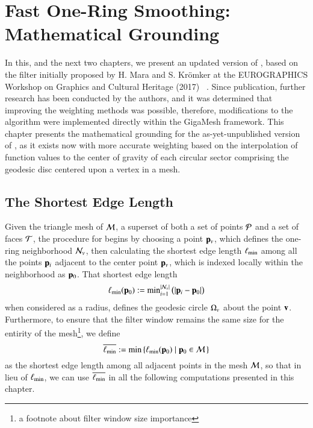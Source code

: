 \chapter{Fast One-Ring Smoothing: Mathematical Grounding}
\label{ch4}
In this, and the next two chapters, we present an updated version of , based on the filter initially proposed by H. Mara and S. Krömker at the EUROGRAPHICS Workshop on Graphics and Cultural Heritage (2017) ~\cite[s.~3.2]{Mara17}. Since publication, further research has been conducted by the authors, and it was determined that improving the weighting methods was possible, therefore, modifications to the algorithm were implemented directly within the GigaMesh  framework. This chapter presents the mathematical grounding for the as-yet-unpublished version of , as it exists now with more accurate weighting based on the interpolation of function values to the center of gravity of each circular sector comprising the geodesic disc centered upon a vertex in a mesh.

%
%
%
%
\section{The Shortest Edge Length}
\label{ch4sSEL}
Given the triangle mesh of \tdd{} $\mathcal{M}$, a superset of both a set of points $\mathcal{P}$ and a set of faces $\mathcal{T}$, the procedure for   begins by choosing a point $\mathbf{p}_v$, which defines the one-ring neighborhood $\mathcal{N}_v$, then calculating the shortest edge length $\ell_\text{min}$ among all the points $\mathbf{p}_i$ adjacent to the center point $\mathbf{p}_v$, which  is indexed locally within the neighborhood as $\mathbf{p}_0$. That shortest edge length
%
\begin{equation}
	\ell_\text{min}(\mathbf{p}_0) := \text{min}^{|\mathcal{N}_v|}_{i=1}\,\big(|\mathbf{p}_i - \mathbf{p}_0|\big)
	\label{eq:localMinimumEdgeLength}
\end{equation}%
%
%
%
when considered as a radius, defines the geodesic circle $\Omega_v$ about the point $\mathbf{v}$. Furthermore, to ensure that the filter window remains the same size for the entirity of the mesh\footnote{a footnote about filter window size importance}, we define
%
\begin{equation}
	\overline{\ell_\text{min}} := \min\left \{\ell_\text{min}(\mathbf{p}_0) \;|\; \mathbf{p}_0 \in \mathcal{M}\,\right \}
	\label{eq:globalMinimumEdgeLength}
\end{equation}%
%
%
as the shortest edge length among all adjacent points in the mesh $\mathcal{M}$, so that in lieu of $\ell_\text{min}$, we can use $\overline{\ell_\text{min}}$ in all the following computations presented in this chapter.

